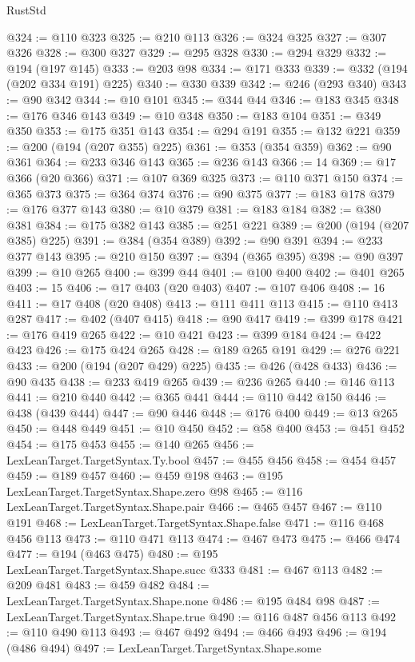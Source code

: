 \begin{lexlean}{RustStd}
\begin{coremodule}
{\begin{coremodule}
{{{{{{{{{{{{{{{{{{{{{{{{{{{{{{{{{{{{{{{{{{{{{@324 := @110 @323
@325 := @210 @113
@326 := @324 @325
@327 := @307 @326
@328 := @300 @327
@329 := @295 @328
@330 := @294 @329
@332 := @194 (@197 @145)
@333 := @203 @98
@334 := @171 @333
@339 := @332 (@194 (@202 @334 @191) @225)
@340 := @330 @339
@342 := @246 (@293 @340)
@343 := @90 @342
@344 := @10 @101
@345 := @344 @44
@346 := @183 @345
@348 := @176 @346 @143
@349 := @10 @348
@350 := @183 @104
@351 := @349 @350
@353 := @175 @351 @143
@354 := @294 @191
@355 := @132 @221
@359 := @200 (@194 (@207 @355) @225)
@361 := @353 (@354 @359)
@362 := @90 @361
@364 := @233 @346 @143
@365 := @236 @143
@366 := 14
@369 := @17 @366 (@20 @366)
@371 := @107 @369 @325
@373 := @110 @371 @150
@374 := @365 @373
@375 := @364 @374
@376 := @90 @375
@377 := @183 @178
@379 := @176 @377 @143
@380 := @10 @379
@381 := @183 @184
@382 := @380 @381
@384 := @175 @382 @143
@385 := @251 @221
@389 := @200 (@194 (@207 @385) @225)
@391 := @384 (@354 @389)
@392 := @90 @391
@394 := @233 @377 @143
@395 := @210 @150
@397 := @394 (@365 @395)
@398 := @90 @397
@399 := @10 @265
@400 := @399 @44
@401 := @100 @400
@402 := @401 @265
@403 := 15
@406 := @17 @403 (@20 @403)
@407 := @107 @406
@408 := 16
@411 := @17 @408 (@20 @408)
@413 := @111 @411 @113
@415 := @110 @413 @287
@417 := @402 (@407 @415)
@418 := @90 @417
@419 := @399 @178
@421 := @176 @419 @265
@422 := @10 @421
@423 := @399 @184
@424 := @422 @423
@426 := @175 @424 @265
@428 := @189 @265 @191
@429 := @276 @221
@433 := @200 (@194 (@207 @429) @225)
@435 := @426 (@428 @433)
@436 := @90 @435
@438 := @233 @419 @265
@439 := @236 @265
@440 := @146 @113
@441 := @210 @440
@442 := @365 @441
@444 := @110 @442 @150
@446 := @438 (@439 @444)
@447 := @90 @446
@448 := @176 @400
@449 := @13 @265
@450 := @448 @449
@451 := @10 @450
@452 := @58 @400
@453 := @451 @452
@454 := @175 @453
@455 := @140 @265
@456 := LexLeanTarget.TargetSyntax.Ty.bool
@457 := @455 @456
@458 := @454 @457
@459 := @189 @457
@460 := @459 @198
@463 := @195 LexLeanTarget.TargetSyntax.Shape.zero @98
@465 := @116 LexLeanTarget.TargetSyntax.Shape.pair
@466 := @465 @457
@467 := @110 @191
@468 := LexLeanTarget.TargetSyntax.Shape.false
@471 := @116 @468 @456 @113
@473 := @110 @471 @113
@474 := @467 @473
@475 := @466 @474
@477 := @194 (@463 @475)
@480 := @195 LexLeanTarget.TargetSyntax.Shape.succ @333
@481 := @467 @113
@482 := @209 @481
@483 := @459 @482
@484 := LexLeanTarget.TargetSyntax.Shape.none
@486 := @195 @484 @98
@487 := LexLeanTarget.TargetSyntax.Shape.true
@490 := @116 @487 @456 @113
@492 := @110 @490 @113
@493 := @467 @492
@494 := @466 @493
@496 := @194 (@486 @494)
@497 := LexLeanTarget.TargetSyntax.Shape.some
}}}}}}}}}}}}}}}}}}}}}}}}}}}}}}}}}}}}}}}}}}}}}
\end{coremodule}}
\end{coremodule}
\end{lexlean}
